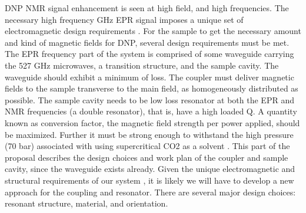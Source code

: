 


%

DNP NMR signal enhancement is seen at high field, and high frequencies.
The necessary high frequency GHz EPR signal imposes a unique set of
electromagnetic design requirements \cite{griesinger2012dynamic}. For
the sample to get the necessary amount and kind of magnetic fields
for DNP, several design requirements must be met. The EPR frequency part
of the system is comprised of some waveguide carrying the 527 GHz
microwaves, a transition structure, and the sample cavity. The waveguide
should exhibit a minimum of loss. The coupler must deliver magnetic fields
to the sample transverse to the main field, as homogeneously distributed
as possible. The sample cavity needs to be
low loss resonator at both the EPR and NMR frequencies (a double resonator),
that is, have a high loaded Q. A quantity known as conversion factor, the
magnetic field strength per power applied, should be maximized. Further it must
be strong enough to withstand the high pressure (70 bar) associated with
using supercritical CO2 as a solvent \cite{tayler2015analysis}.
This part of the proposal describes the design choices and work plan of
the coupler and sample cavity, since the waveguide exists already.
Given the unique electromagnetic and structural requirements of our system , it is likely we will have to develop a new approach
for the coupling and resonator. There are several major design choices: resonant structure, material, and orientation.


